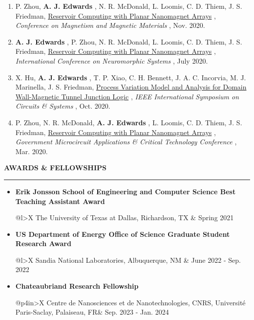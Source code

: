 \documentclass[12pt]{article}
\begin{document}
\begin{enumerate}
\item P. Zhou, \textbf{A. J. Edwards} , N. R. McDonald, L. Loomis, C. D. Thiem, J. S. Friedman, \ul{Reservoir Computing with Planar Nanomagnet Arrays} , \textit{Conference on Magnetism and Magnetic Materials} , Nov. 2020.
\item \textbf{A. J. Edwards} , P. Zhou, N. R. McDonald, L. Loomis, C. D. Thiem, J. S. Friedman, \ul{Reservoir Computing with Planar Nanomagnet Arrays} , \textit{International Conference on Neuromorphic Systems} , July 2020.
\item X. Hu, \textbf{A. J. Edwards} , T. P. Xiao, C. H. Bennett, J. A. C. Incorvia, M. J. Marinella, J. S. Friedman, \href{Papers/HuDWMTJISCAS2020.pdf}{Process Variation Model and Analysis for Domain Wall-Magnetic Tunnel Junction Logic} , \textit{IEEE International Symposium on Circuits \& Systems} , Oct. 2020.
\item P. Zhou, N. R. McDonald, \textbf{A. J. Edwards} , L. Loomis, C. D. Thiem, J. S. Friedman, \ul{Reservoir Computing with Planar Nanomagnet Arrays} , \textit{Government Microcircuit Applications \& Critical Technology Conference} , Mar. 2020.

\end{enumerate}



\newpage

{\Large \textbf{AWARDS \& FELLOWSHIPS}}

\textcolor{gray}{\rule{\textwidth}{2pt}}

\begin{itemize}
    \item \textbf{Erik Jonsson School of Engineering and Computer Science Best Teaching Assistant Award}\\
    \begin{tabularx}{\linewidth}{{@{}l>{\raggedleft\arraybackslash}X}}
    The University of Texas at Dallas, Richardson, TX & Spring 2021
    \end{tabularx}
    \item \textbf{US Department of Energy Office of Science Graduate Student Research Award}\\
    \begin{tabularx}{\linewidth}{{@{}l>{\raggedleft\arraybackslash}X}}
    Sandia National Laboratories, Albuquerque, NM & June 2022 - Sep. 2022
    \end{tabularx}
    \item \textbf{Chateaubriand Research Fellowship}\\
    \begin{tabularx}{\linewidth}{{@{}p{4in}>{\raggedleft\arraybackslash}X}}
    Centre de Nanosciences et de Nanotechnologies, CNRS, Universit\'e Paris-Saclay, Palaiseau, FR& Sep. 2023 - Jan. 2024 
    \end{tabularx}
\end{itemize}
\end{document}
